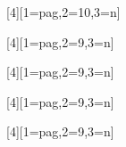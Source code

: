 [4][1=pag,2=10,3=n]{{\color{azulF}\fontsize{#2}{1}\selectfont{#4}}}

[4][1=pag,2=9,3=n]{{\fontsize{#2}{1}\selectfont{#4}}}

[4][1=pag,2=9,3=n]{{\red{}\fontsize{#2}{1}\selectfont{#4}}}

[4][1=pag,2=9,3=n]{{\fontsize{#2}{1}\selectfont{#4}}}

\newcommand{\wfont}[2]{{\fontfamily{#1}\selectfont{#2}}}
\newcommand{\fptm}[1]{{\fontfamily{ptm}\selectfont{#1}}}

[4][1=pag,2=9,3=n]{{\wcelestetxt{}\fontsize{#2}{1}\selectfont{#4}}}

\makeatletter
\renewcommand{\cleardoublepage}{
\clearpage\ifodd\c@page\else
\hbox{}
\vspace*{\fill}
\thispagestyle{empty}
\newpage
\fi}
\makeatother

\usepackage{fancyhdr}
\usepackage[absolute]{textpos}
    \setlength{\TPHorizModule}{10mm}%
    \setlength{\TPVertModule}{10mm}%
    \textblockorigin{0mm}{0mm}%

\makeatletter
\renewcommand{\chaptermark}[1]{\markboth{\if@mainmatter\ ~~\fi#1}{}}
\makeatother

